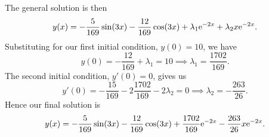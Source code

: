 \begin{exm}{}{}
    The general solution is then
    \begin{equation}
        y(x) = -\frac{5}{169} \sin(3x) - \frac{12}{169} \cos(3x) + \lambda_1\mathrm{e}^{-2x} + \lambda_2x\mathrm{e}^{-2x}.
    \end{equation}
    Substituting for our first initial condition, \(y(0) = 10\), we have
    \begin{equation}
        y(0) = -\frac{12}{169} + \lambda_1 = 10 \implies \lambda_1 = \frac{1702}{169}.
    \end{equation}
    The second initial condition, \(y'(0) = 0\), gives us
    \begin{equation}
        y'(0) = -\frac{15}{169} - 2\frac{1702}{169} - 2\lambda_2 = 0 \implies \lambda_2 = -\frac{263}{26}.
    \end{equation}
    Hence our final solution is
    \begin{equation}
        y(x) = -\frac{5}{169} \sin(3x) - \frac{12}{169} \cos(3x) + \frac{1702}{169}\mathrm{e}^{-2x} - \frac{263}{26}x\mathrm{e}^{-2x}.
    \end{equation}
\end{exm}
